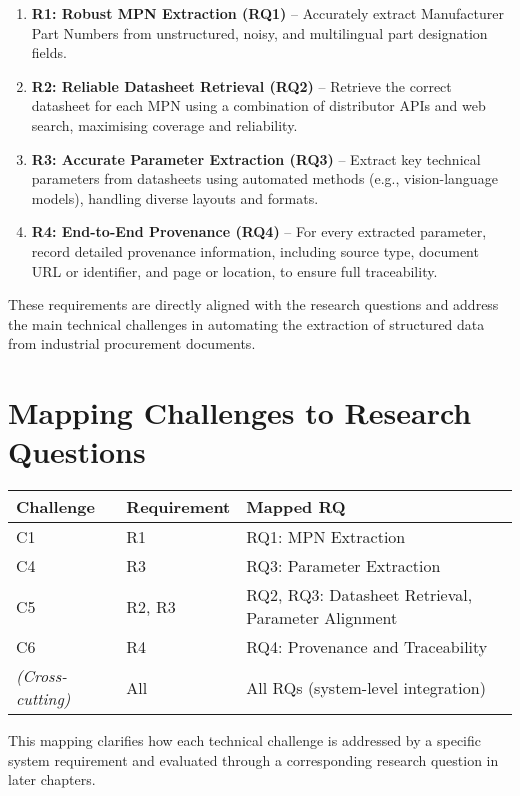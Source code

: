 \begin{enumerate}
  \item \textbf{R1: Robust MPN Extraction (RQ1)} – Accurately extract Manufacturer Part Numbers from unstructured, noisy, and multilingual part designation fields.
  \item \textbf{R2: Reliable Datasheet Retrieval (RQ2)} – Retrieve the correct datasheet for each MPN using a combination of distributor APIs and web search, maximising coverage and reliability.
  \item \textbf{R3: Accurate Parameter Extraction (RQ3)} – Extract key technical parameters from datasheets using automated methods (e.g., vision-language models), handling diverse layouts and formats.
  \item \textbf{R4: End-to-End Provenance (RQ4)} – For every extracted parameter, record detailed provenance information, including source type, document URL or identifier, and page or location, to ensure full traceability.
\end{enumerate}

These requirements are directly aligned with the research questions and address the main technical challenges in automating the extraction of structured data from industrial procurement documents.




\section{Mapping Challenges to Research Questions}
\begin{center}
\begin{tabular}{lll}
\textbf{Challenge} & \textbf{Requirement} & \textbf{Mapped RQ} \\\hline
C1 & R1 & RQ1: MPN Extraction \\
C4 & R3 & RQ3: Parameter Extraction \\
C5 & R2, R3 & RQ2, RQ3: Datasheet Retrieval, Parameter Alignment \\
C6 & R4 & RQ4: Provenance and Traceability \\
\textit{(Cross-cutting)} & All & All RQs (system-level integration) \\
\end{tabular}
\end{center}

This mapping clarifies how each technical challenge is addressed by a specific system requirement and evaluated through a corresponding research question in later chapters.
